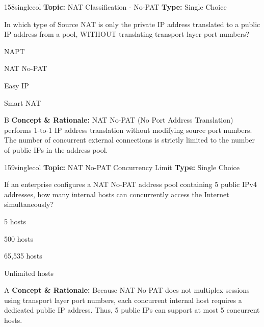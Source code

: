\begin{qcard}{158}{singlecol}
\textcolor{darkslate!75}{\small\textbf{Topic:} NAT Classification - No-PAT \hfill \textbf{Type:} Single Choice}\vspace{0.4em}\par
In which type of Source NAT is only the private IP address translated to a public IP address from a pool, WITHOUT translating transport layer port numbers?
\begin{qoptions}
\item NAPT
\item NAT No-PAT
\item Easy IP
\item Smart NAT
\end{qoptions}
\end{qcard}
\nopagebreak
\begin{explainbox}{B}
\textbf{Concept \& Rationale:} NAT No-PAT (No Port Address Translation) performs 1-to-1 IP address translation without modifying source port numbers. The number of concurrent external connections is strictly limited to the number of public IPs in the address pool.
\end{explainbox}

\begin{qcard}{159}{singlecol}
\textcolor{darkslate!75}{\small\textbf{Topic:} NAT No-PAT Concurrency Limit \hfill \textbf{Type:} Single Choice}\vspace{0.4em}\par
If an enterprise configures a NAT No-PAT address pool containing 5 public IPv4 addresses, how many internal hosts can concurrently access the Internet simultaneously?
\begin{qoptions}
\item 5 hosts
\item 500 hosts
\item 65,535 hosts
\item Unlimited hosts
\end{qoptions}
\end{qcard}
\nopagebreak
\begin{explainbox}{A}
\textbf{Concept \& Rationale:} Because NAT No-PAT does not multiplex sessions using transport layer port numbers, each concurrent internal host requires a dedicated public IP address. Thus, 5 public IPs can support at most 5 concurrent hosts.
\end{explainbox}

